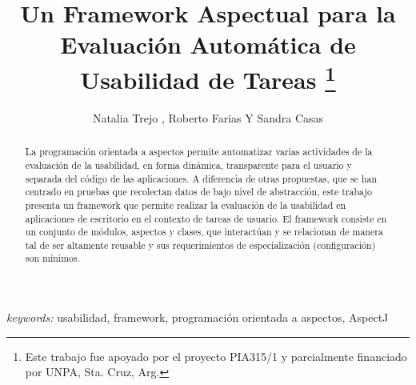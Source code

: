 \documentclass[spanish]{llncs}
\begin{document}
\title{Un Framework Aspectual para la Evaluación Automática de Usabilidad de Tareas
\thanks{Este trabajo fue apoyado por el proyecto PIA315/1 y parcialmente financiado por UNPA, Sta. Cruz, Arg.}}


\author{
Natalia Trejo , 
 Roberto Farias Y
 Sandra Casas    
}







\maketitle


\begin{abstract}
La programación orientada a aspectos permite automatizar varias actividades de la evaluación de la usabilidad, en forma dinámica, transparente para el usuario y separada del código de las aplicaciones. A diferencia de otras propuestas, que se han centrado en pruebas que recolectan datos de bajo nivel de abstracción, este trabajo presenta un framework que permite realizar la evaluación de la usabilidad en aplicaciones de escritorio en el contexto de tareas de usuario. El framework consiste en un conjunto de módulos, aspectos y clases, que interactúan y se relacionan de manera tal de ser altamente reusable y sus requerimientos de especialización (configuración) son mínimos. 
\end{abstract}
{\em keywords:} usabilidad, framework, programación orientada a aspectos, AspectJ















\end{document}
